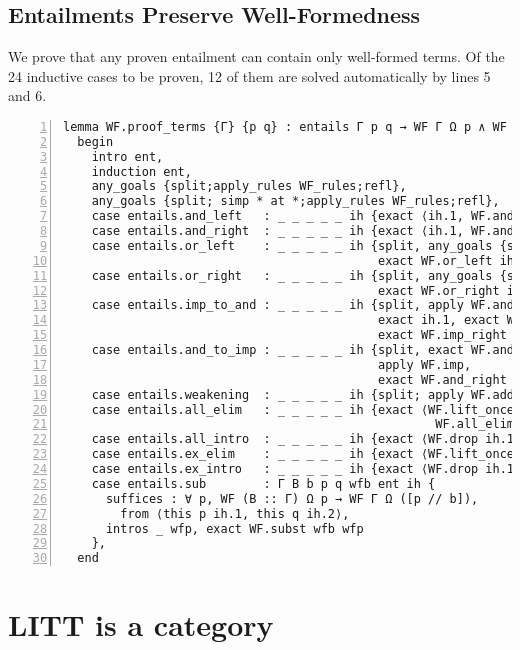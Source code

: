 \documentclass[12pt,leqno]{article}
\theoremstyle{example}
\numberwithin{equation}{section}
\begin{document}
\subsection{Entailments Preserve Well-Formedness} \label{section:WF_proof_terms}
We prove that any proven entailment can contain only well-formed terms. Of the 24 inductive cases to be proven, 12 of them are solved automatically by lines 5 and 6.

\begin{lstlisting}[numbers=left, stepnumber=1, basicstyle=\small\ttfamily]
lemma WF.proof_terms {Γ} {p q} : entails Γ p q → WF Γ Ω p ∧ WF Γ Ω q :=
  begin
    intro ent,
    induction ent,
    any_goals {split;apply_rules WF_rules;refl},
    any_goals {split; simp * at *;apply_rules WF_rules;refl},
    case entails.and_left   : _ _ _ _ _ ih {exact ⟨ih.1, WF.and_left ih.2⟩},
    case entails.and_right  : _ _ _ _ _ ih {exact ⟨ih.1, WF.and_right ih.2⟩},
    case entails.or_left    : _ _ _ _ _ ih {split, any_goals {simp * at *},
                                            exact WF.or_left ih.1},
    case entails.or_right   : _ _ _ _ _ ih {split, any_goals {simp * at *},
                                            exact WF.or_right ih.1},
    case entails.imp_to_and : _ _ _ _ _ ih {split, apply WF.and,
                                            exact ih.1, exact WF.imp_left ih.2, 
                                            exact WF.imp_right ih.2},
    case entails.and_to_imp : _ _ _ _ _ ih {split, exact WF.and_left ih.1,
                                            apply WF.imp,
                                            exact WF.and_right ih.1, exact ih.2},
    case entails.weakening  : _ _ _ _ _ ih {split; apply WF.add_context, tidy},
    case entails.all_elim   : _ _ _ _ _ ih {exact ⟨WF.lift_once ih.1,
                                                    WF.all_elim ih.2⟩},
    case entails.all_intro  : _ _ _ _ _ ih {exact ⟨WF.drop ih.1, WF.all ih.2⟩},
    case entails.ex_elim    : _ _ _ _ _ ih {exact ⟨WF.lift_once ih.1, WF.ex_elim ih.2⟩},
    case entails.ex_intro   : _ _ _ _ _ ih {exact ⟨WF.drop ih.1, WF.ex ih.2⟩},
    case entails.sub        : Γ B b p q wfb ent ih {
      suffices : ∀ p, WF (B :: Γ) Ω p → WF Γ Ω ([p // b]),
        from ⟨this p ih.1, this q ih.2⟩,
      intros _ wfp, exact WF.subst wfb wfp
    },
  end
\end{lstlisting}

\section{LITT is a category}
\end{document}
